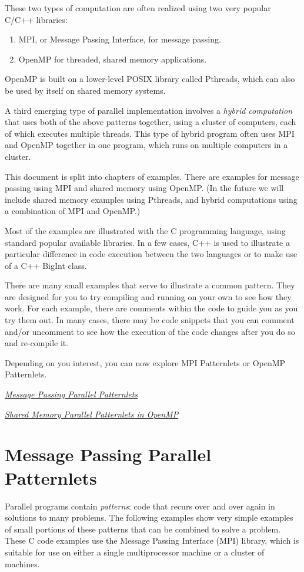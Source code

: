 \documentclass[letterpaper,10pt,openany,oneside]{sphinxmanual}
\begin{document}
These two types of computation are often realized using two very popular C/C++ libraries:
\begin{enumerate}
\item {} 
MPI, or Message Passing Interface, for message passing.

\item {} 
OpenMP for threaded, shared memory applications.

\end{enumerate}

OpenMP is built on a lower-level POSIX library called Pthreads, which can also be used by itself on shared memory systems.

A third emerging type of parallel implementation involves a \emph{hybrid computation} that uses both of the above patterns together, using a cluster of computers, each of which executes multiple threads.  This type of hybrid program often uses MPI and OpenMP together in one program, which runs on multiple computers in a cluster.

This document is split into chapters of examples.  There are examples for message passing using MPI and shared memory using OpenMP.
(In the future we will include shared memory examples using Pthreads, and hybrid computations using a combination of MPI and OpenMP.)

Most of the examples are illustrated
with the C programming language, using standard popular available libraries. In a few cases, C++
is used to illustrate a particular difference in code execution between the two languages or to make use of a C++ BigInt class.

There are many small examples that serve to illustrate a common pattern.  They are designed for you to try compiling and running on your own to see how they work.  For each example, there are comments within the code to guide you as you try them out.  In many cases, there may be code snippets that you can comment and/or uncomment to see how the execution of the code changes after you do so and re-compile it.

Depending on you interest, you can now explore MPI Patternlets or OpenMP Patternlets.

{\hyperref[MessagePassing/MPI_Patternlets::doc]{\emph{Message Passing Parallel Patternlets}}}

{\hyperref[SharedMemory/OpenMP_Patternlets::doc]{\emph{Shared Memory Parallel Patternlets in OpenMP}}}


\chapter{Message Passing Parallel Patternlets}
\label{MessagePassing/MPI_Patternlets:message-passing-parallel-patternlets}\label{MessagePassing/MPI_Patternlets::doc}
Parallel programs contain \emph{patterns}:  code that recurs over and over again
in solutions to many problems.  The following examples show very simple
examples of small portions of
these patterns that can be combined to solve a problem.  These C code examples use the
Message Passing Interface (MPI) library, which is suitable for use on either a
single multiprocessor machine or a cluster
of machines.
\end{document}
